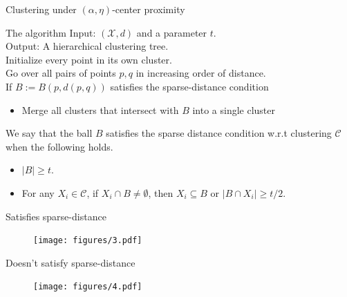 \documentclass{beamer}
\newcommand{\mc}{\mathcal}
\begin{document}
\begin{frame}{Clustering under $(\alpha, \eta)$-center proximity}
	\begin{block}{The algorithm}
	  Input: $(\mc X, d)$ and a parameter $t$.\\
	  Output: A hierarchical clustering tree.\\
	  \vspace{0.1in}Initialize every point in its own cluster.\\
	  Go over all pairs of points $p, q$ in increasing order of distance.\\
	  If $B := B(p, d(p, q))$ satisfies the sparse-distance condition
	  \begin{itemize}
	  	\item Merge all clusters that intersect with $B$ into a single cluster
	  \end{itemize}
    \end{block}
        
    \vspace{0.2in}We say that the ball $B$ satisfies the sparse distance condition w.r.t clustering $\mc C$ when the following holds.
	\begin{itemize}
	  \item $|B| \ge t$.
	  \item For any $X_i \in \mc C$, if $X_i \cap B \neq \emptyset$, then $X_i \subseteq B$ or $|B \cap X_i| \ge t/2$.
	\end{itemize}
\end{frame}

\begin{frame}{Satisfies sparse-distance}
   \begin{figure}
	  \texttt{[image: figures/3.pdf]}
   \end{figure}
\end{frame}
\begin{frame}{Doesn't satisfy sparse-distance}   
   \begin{figure}
	  \texttt{[image: figures/4.pdf]}
   \end{figure}
\end{frame}
\end{document}
